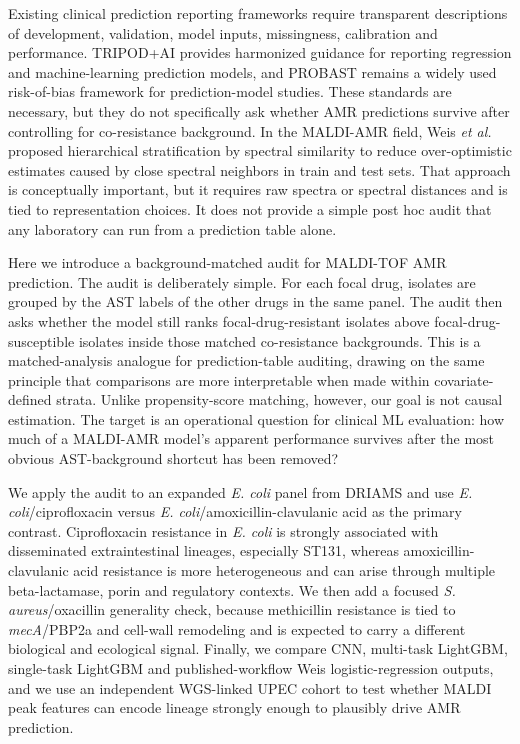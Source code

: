 \documentclass[11pt]{article}
\begin{document}
Existing clinical prediction reporting frameworks require transparent descriptions of development, validation, model inputs, missingness, calibration and performance\cite{tripod2015,probast2019,tripodAI2024}. TRIPOD+AI provides harmonized guidance for reporting regression and machine-learning prediction models\cite{tripodAI2024}, and PROBAST remains a widely used risk-of-bias framework for prediction-model studies\cite{probast2019}. These standards are necessary, but they do not specifically ask whether AMR predictions survive after controlling for co-resistance background. In the MALDI-AMR field, Weis \textit{et al.} proposed hierarchical stratification by spectral similarity to reduce over-optimistic estimates caused by close spectral neighbors in train and test sets\cite{weis2022stratification}. That approach is conceptually important, but it requires raw spectra or spectral distances and is tied to representation choices. It does not provide a simple post hoc audit that any laboratory can run from a prediction table alone.

Here we introduce a background-matched audit for MALDI-TOF AMR prediction. The audit is deliberately simple. For each focal drug, isolates are grouped by the AST labels of the other drugs in the same panel. The audit then asks whether the model still ranks focal-drug-resistant isolates above focal-drug-susceptible isolates inside those matched co-resistance backgrounds. This is a matched-analysis analogue for prediction-table auditing, drawing on the same principle that comparisons are more interpretable when made within covariate-defined strata\cite{rosenbaumRubin1983,austin2011propensity}. Unlike propensity-score matching, however, our goal is not causal estimation. The target is an operational question for clinical ML evaluation: how much of a MALDI-AMR model's apparent performance survives after the most obvious AST-background shortcut has been removed?

We apply the audit to an expanded \textit{E. coli} panel from DRIAMS and use \textit{E. coli}/ciprofloxacin versus \textit{E. coli}/amoxicillin-clavulanic acid as the primary contrast. Ciprofloxacin resistance in \textit{E. coli} is strongly associated with disseminated extraintestinal lineages, especially ST131, whereas amoxicillin-clavulanic acid resistance is more heterogeneous and can arise through multiple beta-lactamase, porin and regulatory contexts\cite{nicolas2014st131,price2013st131,benzakour2016st131,canton2011coresistance,pal2015cooccurrence}. We then add a focused \textit{S. aureus}/oxacillin generality check, because methicillin resistance is tied to \textit{mecA}/PBP2a and cell-wall remodeling and is expected to carry a different biological and ecological signal\cite{chambers1997mrsa}. Finally, we compare CNN, multi-task LightGBM, single-task LightGBM and published-workflow Weis logistic-regression outputs, and we use an independent WGS-linked UPEC cohort to test whether MALDI peak features can encode lineage strongly enough to plausibly drive AMR prediction.
\end{document}
